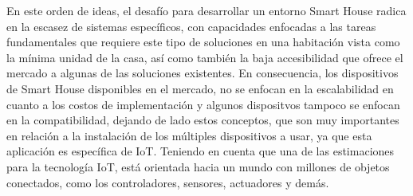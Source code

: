 En este orden de ideas, el desafío para desarrollar un entorno Smart House radica en la escasez de sistemas específicos, con capacidades enfocadas a las tareas fundamentales que requiere este tipo de soluciones en una habitación vista como la mínima unidad de la casa, así como también la baja accesibilidad que ofrece el mercado a algunas de las soluciones existentes. En consecuencia, los dispositivos de Smart House disponibles en el mercado, no se enfocan en la escalabilidad en cuanto a los costos de implementación y algunos dispositvos tampoco se enfocan en la compatibilidad, dejando de lado estos conceptos, que son muy importantes en relación a la instalación de los múltiples dispositivos a usar, ya que esta aplicación es específica de IoT. Teniendo en cuenta que una de las estimaciones para la tecnología IoT, está orientada hacia un mundo con millones de objetos conectados, como los controladores, sensores, actuadores y demás.\\
